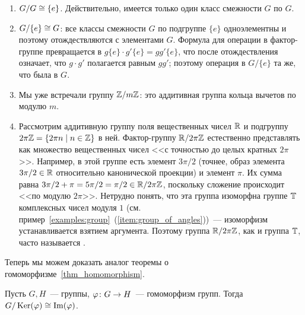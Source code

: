\begin{examples}\label{examples:quotient-groups}
\begin{enumerate}
\item $G/G\cong\{e\}$. Действительно, имеется только один класс
  смежности $G$ по $G$.
\item $G/\{e\}\cong G$: все классы смежности $G$ по подгруппе $\{e\}$
  одноэлементны и поэтому отождествляются с элементами
  $G$. Формула для операции в фактор-группе превращается в
  $g\{e\}\cdot g'\{e\} = gg'\{e\}$, что после отождествления означает,
  что $g\cdot g'$ полагается равным $gg'$; поэтому операция в
  $G/\{e\}$ та же, что была в $G$.
\item Мы уже встречали группу $\mathbb Z/m\mathbb Z$: это аддитивная группа
  кольца вычетов по модулю $m$.
\item\label{item:angles-as-quotient-group}
  Рассмотрим аддитивную группу поля вещественных чисел $\mathbb R$
  и подгруппу $2\pi\mathbb Z = \{2\pi n\mid n\in\mathbb Z\}$ в ней.
  Фактор-группу $\mathbb R/2\pi\mathbb Z$ естественно представлять как множество
  вещественных чисел <<с точностью до целых кратных $2\pi$>>. Например,
  в этой группе есть элемент $3\pi/2$ (точнее, образ элемента
  $3\pi/2\in\mathbb R$ относительно канонической проекции) и элемент
  $\pi$. Их сумма равна $3\pi/2 + \pi = 5\pi/2 = \pi/2\in\mathbb R/2\pi\mathbb Z$,
  поскольку сложение происходит <<по модулю $2\pi$>>.
  Нетрудно понять, что эта группа изоморфна группе $\mathbb T$ комплексных
  чисел модуля $1$
  (см. пример~\ref{examples:group}~(\ref{item:group_of_angles}))~---
  изоморфизм устанавливается взятием аргумента.
  Поэтому группа $\mathbb R/2\pi\mathbb Z$, как и группа $\mathbb T$, часто
  называется .
\end{enumerate}
\end{examples}

Теперь мы можем доказать аналог теоремы о
гомоморфизме~\ref{thm_homomorphism}.

\begin{theorem}\label{thm:homomorphism_groups}
Пусть $G, H$~--- группы, $\varphi\colon G\to H$~--- гомоморфизм
групп. Тогда $G/\operatorname{Ker}(\varphi)\cong\operatorname{Im}(\varphi)$.
\end{theorem}

